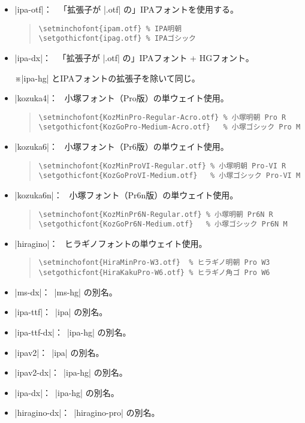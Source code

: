 \documentclass[a4paper,uplatex]{jsarticle}
\newcommand{\Note}{\par\noindent ※}
\newcommand{\Means}{：\ }
\begin{document}
\begin{itemize}
\item |ipa-otf|\Means
  「拡張子が |.otf| の」IPAフォントを使用する。
\begin{quote}\small\begin{verbatim}
\setminchofont{ipam.otf} % IPA明朝
\setgothicfont{ipag.otf} % IPAゴシック
\end{verbatim}\end{quote}

\item |ipa-dx|\Means
  「拡張子が |.otf| の」IPAフォント + HGフォント。
  \Note |ipa-hg| とIPAフォントの拡張子を除いて同じ。

\item |kozuka4|\Means
  小塚フォント（Pro版）の単ウェイト使用。
\begin{quote}\small\begin{verbatim}
\setminchofont{KozMinPro-Regular-Acro.otf} % 小塚明朝 Pro R
\setgothicfont{KozGoPro-Medium-Acro.otf}   % 小塚ゴシック Pro M
\end{verbatim}\end{quote}

\item |kozuka6|\Means
  小塚フォント（Pr6版）の単ウェイト使用。
\begin{quote}\small\begin{verbatim}
\setminchofont{KozMinProVI-Regular.otf} % 小塚明朝 Pro-VI R
\setgothicfont{KozGoProVI-Medium.otf}   % 小塚ゴシック Pro-VI M
\end{verbatim}\end{quote}

\item |kozuka6n|\Means
  小塚フォント（Pr6n版）の単ウェイト使用。
\begin{quote}\small\begin{verbatim}
\setminchofont{KozMinPr6N-Regular.otf} % 小塚明朝 Pr6N R
\setgothicfont{KozGoPr6N-Medium.otf}   % 小塚ゴシック Pr6N M
\end{verbatim}\end{quote}

\item |hiragino|\Means
  ヒラギノフォントの単ウェイト使用。
\begin{quote}\small\begin{verbatim}
\setminchofont{HiraMinPro-W3.otf}  % ヒラギノ明朝 Pro W3
\setgothicfont{HiraKakuPro-W6.otf} % ヒラギノ角ゴ Pro W6
\end{verbatim}\end{quote}

\item |ms-dx|\Means |ms-hg| の別名。
\item |ipa-ttf|\Means |ipa| の別名。
\item |ipa-ttf-dx|\Means |ipa-hg| の別名。
\item |ipav2|\Means |ipa| の別名。
\item |ipav2-dx|\Means |ipa-hg| の別名。
\item |ipa-dx|\Means |ipa-hg| の別名。
\item |hiragino-dx|\Means |hiragino-pro| の別名。
\end{itemize}
\end{document}
